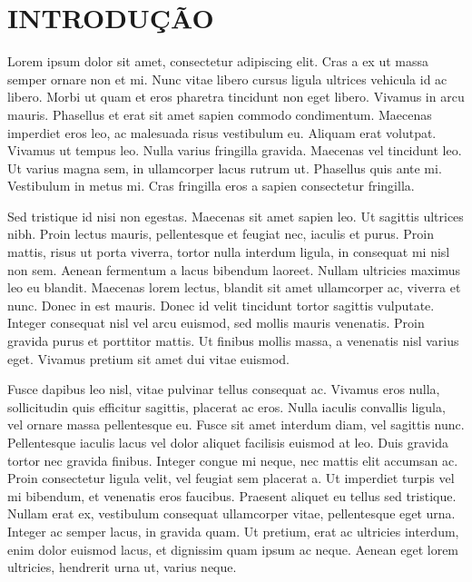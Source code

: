 \chapter{INTRODUÇÃO}

Lorem ipsum dolor sit amet, consectetur adipiscing elit. Cras a ex ut massa semper ornare non et mi. Nunc vitae libero cursus ligula ultrices vehicula id ac libero. Morbi ut quam et eros pharetra tincidunt non eget libero. Vivamus in arcu mauris. Phasellus et erat sit amet sapien commodo condimentum. Maecenas imperdiet eros leo, ac malesuada risus vestibulum eu. Aliquam erat volutpat. Vivamus ut tempus leo. Nulla varius fringilla gravida. Maecenas vel tincidunt leo. Ut varius magna sem, in ullamcorper lacus rutrum ut. Phasellus quis ante mi. Vestibulum in metus mi. Cras fringilla eros a sapien consectetur fringilla.

Sed tristique id nisi non egestas. Maecenas sit amet sapien leo. Ut sagittis ultrices nibh. Proin lectus mauris, pellentesque et feugiat nec, iaculis et purus. Proin mattis, risus ut porta viverra, tortor nulla interdum ligula, in consequat mi nisl non sem. Aenean fermentum a lacus bibendum laoreet. Nullam ultricies maximus leo eu blandit. Maecenas lorem lectus, blandit sit amet ullamcorper ac, viverra et nunc. Donec in est mauris. Donec id velit tincidunt tortor sagittis vulputate. Integer consequat nisl vel arcu euismod, sed mollis mauris venenatis. Proin gravida purus et porttitor mattis. Ut finibus mollis massa, a venenatis nisl varius eget. Vivamus pretium sit amet dui vitae euismod.

Fusce dapibus leo nisl, vitae pulvinar tellus consequat ac. Vivamus eros nulla, sollicitudin quis efficitur sagittis, placerat ac eros. Nulla iaculis convallis ligula, vel ornare massa pellentesque eu. Fusce sit amet interdum diam, vel sagittis nunc. Pellentesque iaculis lacus vel dolor aliquet facilisis euismod at leo. Duis gravida tortor nec gravida finibus. Integer congue mi neque, nec mattis elit accumsan ac. Proin consectetur ligula velit, vel feugiat sem placerat a. Ut imperdiet turpis vel mi bibendum, et venenatis eros faucibus. Praesent aliquet eu tellus sed tristique. Nullam erat ex, vestibulum consequat ullamcorper vitae, pellentesque eget urna. Integer ac semper lacus, in gravida quam. Ut pretium, erat ac ultricies interdum, enim dolor euismod lacus, et dignissim quam ipsum ac neque. Aenean eget lorem ultricies, hendrerit urna ut, varius neque. 
